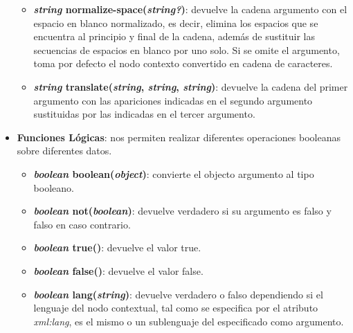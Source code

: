 \begin{itemize}
\begin{itemize}
        \item \textbf{\textit{string} normalize-space(\textit{string?})}: devuelve la cadena argumento con el espacio en blanco normalizado, es decir, elimina los espacios que se encuentra al principio y final de la cadena, además de sustituir las secuencias de espacios en blanco por uno solo. Si se omite el argumento, toma por defecto el nodo contexto convertido en cadena de caracteres.
        \item \textbf{\textit{string} translate(\textit{string}, \textit{string}, \textit{string})}: devuelve la cadena del primer argumento con las apariciones indicadas en el segundo argumento sustituidas por las indicadas en el tercer argumento.
    \end{itemize}

    \item \textbf{Funciones Lógicas}: nos permiten realizar diferentes operaciones booleanas sobre diferentes datos.
    \begin{itemize}
        \item \textbf{\textit{boolean} boolean(\textit{object})}: convierte el objecto argumento al tipo booleano.
        \item \textbf{\textit{boolean} not(\textit{boolean})}: devuelve verdadero si su argumento es falso y falso en caso contrario.
        \item \textbf{\textit{boolean} true()}: devuelve el valor true.
        \item \textbf{\textit{boolean} false()}: devuelve el valor false.
        \item \textbf{\textit{boolean} lang(\textit{string})}: devuelve verdadero o falso dependiendo si el lenguaje del nodo contextual, tal como se especifica por el atributo \textit{xml:lang}, es el mismo o un sublenguaje del especificado como argumento.
    \end{itemize}


\end{itemize}
